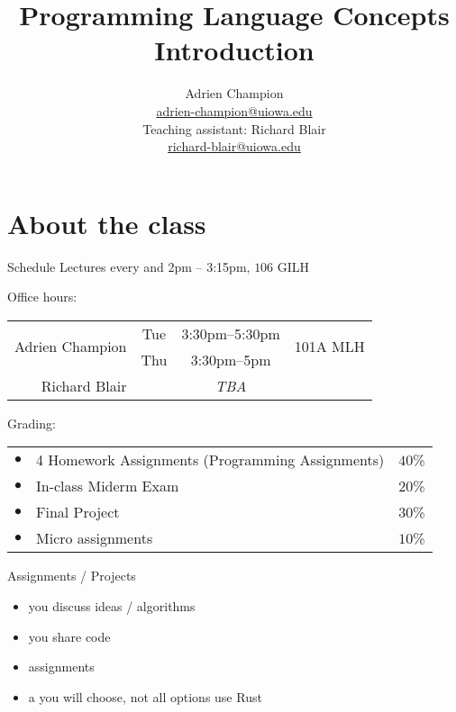 \documentclass[10pt]{beamer}
\title{
  Programming Language Concepts\\[3em]
  Introduction\\[2em]
}
\author[]{
  Adrien Champion \\
  \href{mailto:adrien-champion@uiowa.edu}{adrien-champion@uiowa.edu}\\[4pt]
  Teaching assistant: Richard Blair \\
  \href{mailto:richard-blair@uiowa.edu}{richard-blair@uiowa.edu}
}
\date{}
\begin{document}
\addtolength{\leftmargin}{-20pt}
\addtolength{\rightmargin}{-20pt}



\begin{frame}{}
  \titlepage
\end{frame}



\section{About the class}


\begin{frame}{Schedule}
  Lectures every  and  2pm -- 3:15pm, $106$ GILH
  \bigskip

  Office hours:
  \begin{center}
    \begin{tabular}{r | c c c}
      \multirow{2}{*}{Adrien Champion} &
        Tue &
        3:30pm--5:30pm &
        \multirow{2}{*}{101A MLH} \\
      &
        Thu &
        3:30pm--5pm \\ \hline
      Richard Blair & & \textit{TBA}
    \end{tabular}
  \end{center}
  \bigskip

  Grading:
  \begin{center}
    \begin{tabular}{c l c}
      $\bullet$ & 4 Homework Assignments (Programming Assignments) & $40$\%\\
      $\bullet$ & In-class Miderm Exam & $20$\%\\
      $\bullet$ & Final Project & $30$\%\\
      $\bullet$ & Micro assignments & $10$\%
    \end{tabular}
  \end{center}
\end{frame}





\begin{frame}{Assignments / Projects}

\begin{itemize}
  \bigsep
  \item you  discuss ideas / algorithms
  \item you  share code
\end{itemize}
\bigskip

\pause

\begin{itemize}
  \item assignments 
  \item a  you will choose, not all options use Rust
\end{itemize}

\end{frame}
\end{document}

